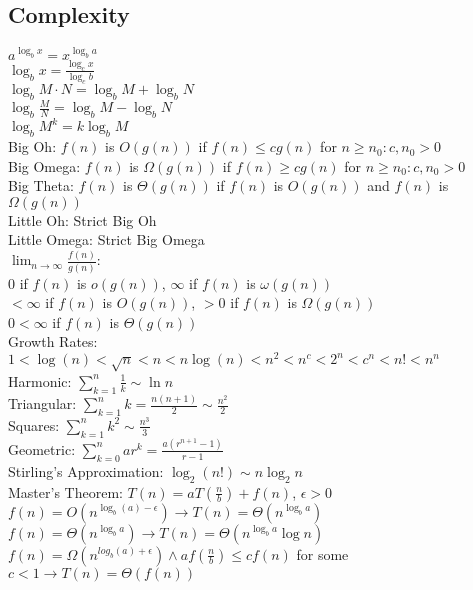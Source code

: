 \documentclass{article}
\begin{document}
\begin{multicols*}{2}
        \subsection*{Complexity}
        $a^{\log_b x} = x^{\log_b a}$\\
        $\log_b x = \frac{\log_c x}{\log_c b}$\\
        $\log_b M \cdot N = \log_b M + \log_b N$\\
        $\log_b \frac{M}{N} = \log_b M - \log_b N$\\
        $\log_b M^k = k\log_b M$\\
        Big Oh: $f(n)$ is $O(g(n))$ if $f(n) \leq cg(n)$ for $n \geq n_0 : c, n_0 > 0$\\
        Big Omega: $f(n)$ is $\Omega(g(n))$ if $f(n) \geq cg(n)$ for $n \geq n_0 : c, n_0 > 0$\\
        Big Theta: $f(n)$ is $\Theta(g(n))$ if $f(n)$ is $O(g(n))$ and $f(n)$ is $\Omega(g(n))$\\
        Little Oh: Strict Big Oh\\
        Little Omega: Strict Big Omega\\
        $\lim_{n\to\infty}\frac{f(n)}{g(n)}$:\\
        0 if $f(n)$ is $o(g(n))$, $\infty$ if $f(n)$ is $\omega(g(n))$\\
        $< \infty$ if $f(n)$ is $O(g(n))$, $> 0$ if $f(n)$ is $\Omega(g(n))$\\
        $0 < \infty$ if $f(n)$ is $\Theta(g(n))$\\
        Growth Rates: $1 < \log(n) < \sqrt{n} < n < n\log(n) < n^2 < n^c < 2^n < c^n < n! < n^n$\\
        Harmonic: $\sum_{k=1}^{n} \frac{1}{k} \sim \ln n$\\
        Triangular: $\sum_{k=1}^{n} k = \frac{n(n + 1)}{2} \sim \frac{n^2}{2}$\\
        Squares: $\sum_{k=1}^{n} k^2 \sim \frac{n^3}{3}$\\
        Geometric: $\sum_{k=0}^{n} ar^k = \frac{a(r^{n+1} - 1)}{r - 1}$\\
        Stirling's Approximation: $\log_2(n!) \sim n\log_2 n$\\
        Master's Theorem: $T(n) = aT(\frac{n}{b}) + f(n)$, $\epsilon > 0$\\
        $f(n) = O(n^{\log_b (a) - \epsilon}) \to T(n) = \Theta(n^{\log_b a})$\\
        $f(n) = \Theta(n^{\log_b a}) \to T(n) = \Theta(n^{\log_b a}\log n)$\\
        $f(n) = \Omega(n^{log_b (a) + \epsilon}) \wedge af(\frac{n}{b}) \leq cf(n)$ for some $c
        < 1 \to T(n) = \Theta(f(n))$

\end{multicols*}
\end{document}
